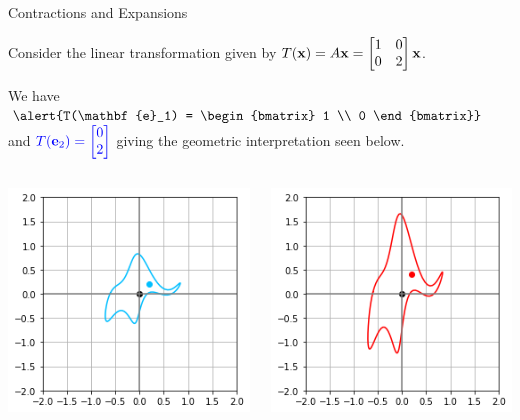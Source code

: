 \documentclass[xcolor=dvipsnames,aspectratio=169,t]{beamer}
\begin{document}
\begin{frame}{Contractions and Expansions}

Consider the linear transformation given by $\displaystyle T(\mathbf{x}) = A \mathbf{x} = \begin{bmatrix} 1 & 0 \\ 0 & 2 \end{bmatrix}\mathbf{x}$. 

We have  $\dsty \alert{T(\mathbf{e}_1) = \begin{bmatrix} 1 \\ 0 \end{bmatrix}}$ and $\displaystyle \textcolor{blue}{T(\mathbf{e}_2) = \begin{bmatrix} 0 \\ 2 \end{bmatrix}}$ giving the geometric interpretation seen below.

\begin{columns}

\column{0.5\tw}

\begin{center}
\includegraphics[width=0.6\tw]{images/fig-elephant2.png}
\end{center}

\column{0.5\tw}

\begin{center}
\includegraphics[width=0.6\tw]{images/fig-ele-expand.png}
\end{center}

\end{columns}

\end{frame}
\end{document}
